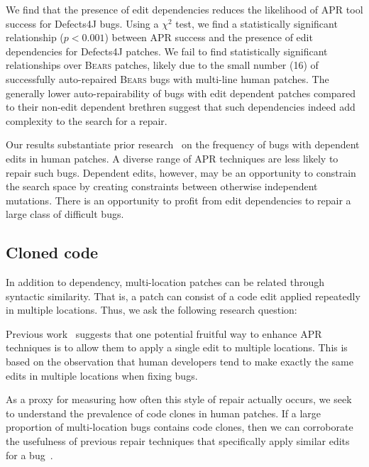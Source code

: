 \documentclass[10pt, conference]{IEEEtran}
\newcommand\bears{\textsc{Bears}\xspace}
\begin{document}
We find that the presence of edit dependencies 
reduces the likelihood of APR tool success for Defects4J bugs.
Using a $\chi^2$ test, we find a statistically significant relationship ($p < 0.001$)
between APR success and the presence of edit dependencies for Defects4J patches. 
We fail to find statistically 
significant relationships over \bears patches, likely due to the small number (16) of 
successfully auto-repaired \bears bugs with multi-line human patches.
The generally lower auto-repairability of bugs with edit dependent patches compared 
to their non-edit dependent brethren suggest that such dependencies indeed 
add complexity to the search for a repair.

Our results substantiate prior research~\cite{zhong2015} on the frequency of 
bugs with dependent edits in human patches. A diverse range of APR 
techniques are less likely to repair such bugs. Dependent edits, however, may 
be an opportunity to constrain the search space by creating constraints between 
otherwise independent mutations. There is an opportunity to profit from edit 
dependencies to repair a large class of difficult bugs.


\subsection{Cloned code}

In addition to dependency, multi-location patches can be related through syntactic
similarity. That is, a patch can consist of a code edit applied repeatedly in
multiple locations. Thus, we ask the following research question:


Previous work~\cite{wang2018} suggests that one potential fruitful way to enhance
APR techniques is to allow them to apply a single edit to multiple locations.
This is based on the observation that human developers tend to make exactly the 
same edits in multiple locations when fixing bugs. 

As a proxy for measuring how often this style of repair actually occurs, we seek
to understand the 
prevalence of code clones in human patches. If a large proportion of multi-location bugs contains code 
clones, then we can corroborate the usefulness of previous repair techniques that specifically apply 
similar 
edits for a bug~\cite{saha2019harnessing}.
\end{document}
